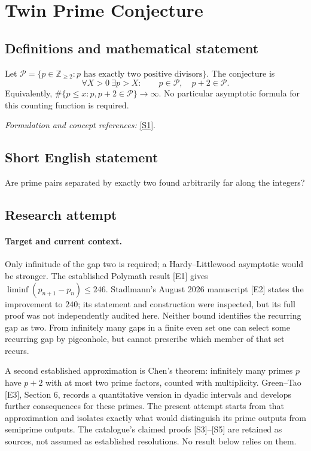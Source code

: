\documentclass[11pt]{article}
\begin{document}
\section*{\texorpdfstring{Twin Prime Conjecture}{Twin Prime Conjecture}}\label{20}
\subsection{Definitions and mathematical statement}
Let $\mathcal P=\{p\in{\mathbb{Z}}_{\ge2}:p\text{ has exactly two positive divisors}\}$. The conjecture is
\[
 \forall X>0\ \exists p>X:\qquad p\in\mathcal P,\quad p+2\in\mathcal P.
\]
Equivalently, $\#\{p\le x:p,p+2\in\mathcal P\}\to\infty$. No particular asymptotic formula for this counting function is required.
\par\smallskip\textit{Formulation and concept references:} \href{https://mathworld.wolfram.com/TwinPrimeConjecture.html}{[S1]}.

\subsection{Short English statement}
Are prime pairs separated by exactly two found arbitrarily far along the integers?
\subsection{Research attempt}

\paragraph{Target and current context.}
Only infinitude of the gap two is required; a Hardy--Littlewood
asymptotic would be stronger. The established Polymath result [E1]
gives $\liminf(p_{n+1}-p_n)\le246$. Stadlmann's August 2026 manuscript
[E2] states the improvement to $240$; its statement and construction were
inspected, but its full proof was not independently audited here. Neither
bound identifies the recurring gap as two. From infinitely many gaps in
a finite even set one can select some recurring gap by pigeonhole, but
cannot prescribe which member of that set recurs.

A second established approximation is Chen's theorem: infinitely many
primes $p$ have $p+2$ with at most two prime factors, counted with
multiplicity. Green--Tao [E3], Section 6, records a quantitative version
in dyadic intervals and develops further consequences for these primes.
The present attempt starts from that approximation and isolates exactly
what would distinguish its prime outputs from semiprime outputs. The
catalogue's claimed proofs [S3]--[S5] are retained as sources, not assumed
as established resolutions. No result below relies on them.
\end{document}

